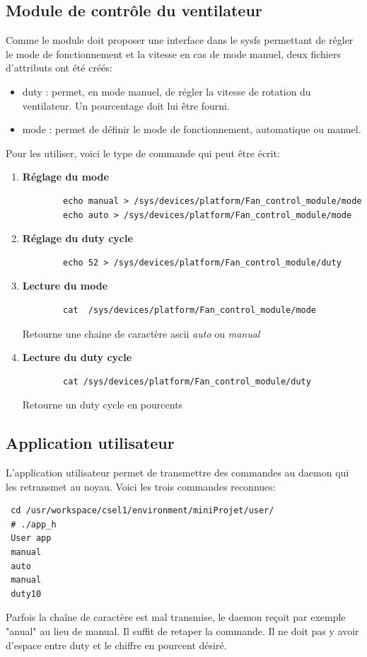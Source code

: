 \subsection{Module de contrôle du ventilateur}
Comme le module doit proposer une interface dans le sysfs permettant de régler le mode de fonctionnement et la vitesse en cas de mode manuel, deux fichiers d'attributs ont été créés:
\begin{itemize}
	\item duty : permet, en mode manuel, de régler la vitesse de rotation du ventilateur. Un pourcentage doit lui être fourni.
	\item mode : permet de définir le mode de fonctionnement, automatique ou manuel. 
\end{itemize}
Pour les utiliser, voici le type de commande qui peut être écrit:\\
\begin{enumerate}
	\item \textbf{Réglage du mode}\\
	\begin{lstlisting}
		echo manual > /sys/devices/platform/Fan_control_module/mode
		echo auto > /sys/devices/platform/Fan_control_module/mode
	\end{lstlisting}
	\item \textbf{Réglage du duty cycle}
	\begin{lstlisting}
		echo 52 > /sys/devices/platform/Fan_control_module/duty
	\end{lstlisting}
	\item \textbf{Lecture du mode}
	\begin{lstlisting}
		cat  /sys/devices/platform/Fan_control_module/mode
	\end{lstlisting}
	Retourne une chaine de caractère ascii \textit{auto} ou \textit{manual}
	\item \textbf{Lecture du duty cycle}
	\begin{lstlisting}
		cat /sys/devices/platform/Fan_control_module/duty 
	\end{lstlisting}
	Retourne un duty cycle en pourcents
\end{enumerate}

\subsection{Application utilisateur}
L'application utilisateur permet de transmettre des commandes au daemon qui les retransmet au noyau. Voici les trois commandes reconnues:
\begin{lstlisting}
 cd /usr/workspace/csel1/environment/miniProjet/user/
 # ./app_h 
 User app
 manual
 auto
 manual
 duty10
\end{lstlisting}
Parfois la chaîne de caractère est mal transmise, le daemon reçoit par exemple "anual" au lieu de manual. Il suffit de retaper la commande. Il ne doit pas y avoir d'espace entre duty et le chiffre en pourcent désiré.
